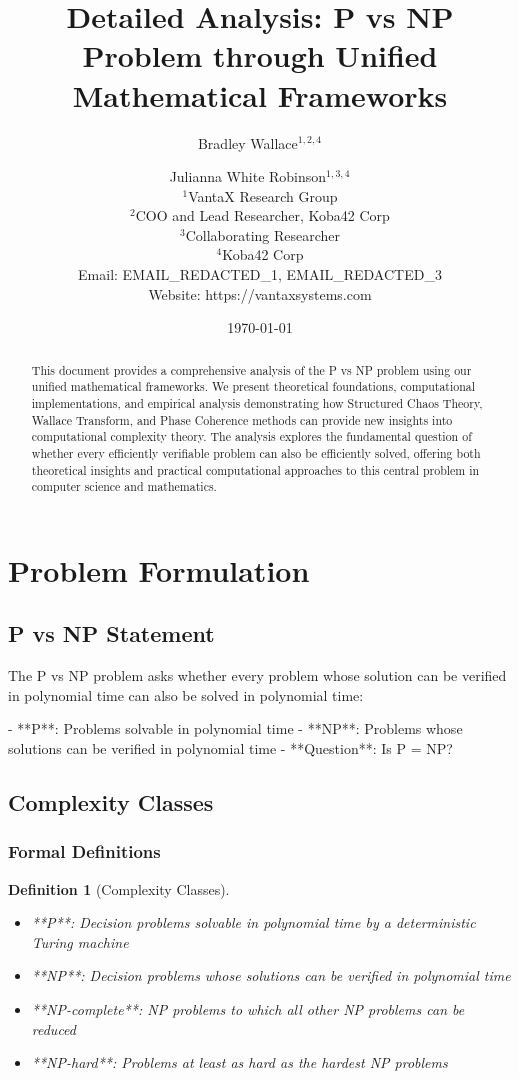 \documentclass[12pt]{article}
\title{Detailed Analysis: P vs NP Problem through Unified Mathematical Frameworks}
\author{
Bradley Wallace$^{1,2,4}$ \and Julianna White Robinson$^{1,3,4}$ \\
$^1$VantaX Research Group \\
$^2$COO and Lead Researcher, Koba42 Corp \\
$^3$Collaborating Researcher \\
$^4$Koba42 Corp \\
Email: EMAIL_REDACTED_1, EMAIL_REDACTED_3 \\
Website: https://vantaxsystems.com
}
\date{\today}
\newtheorem{definition}{Definition}
\begin{document}
\maketitle

\begin{abstract}
This document provides a comprehensive analysis of the P vs NP problem using our unified mathematical frameworks. We present theoretical foundations, computational implementations, and empirical analysis demonstrating how Structured Chaos Theory, Wallace Transform, and Phase Coherence methods can provide new insights into computational complexity theory. The analysis explores the fundamental question of whether every efficiently verifiable problem can also be efficiently solved, offering both theoretical insights and practical computational approaches to this central problem in computer science and mathematics.
\end{abstract}

\section{Problem Formulation}

\subsection{P vs NP Statement}

The P vs NP problem asks whether every problem whose solution can be verified in polynomial time can also be solved in polynomial time:

- **P**: Problems solvable in polynomial time
- **NP**: Problems whose solutions can be verified in polynomial time
- **Question**: Is P = NP?

\subsection{Complexity Classes}

\subsubsection{Formal Definitions}

\begin{definition}[Complexity Classes]
\begin{itemize}
    \item **P**: Decision problems solvable in polynomial time by a deterministic Turing machine
    \item **NP**: Decision problems whose solutions can be verified in polynomial time
    \item **NP-complete**: NP problems to which all other NP problems can be reduced
    \item **NP-hard**: Problems at least as hard as the hardest NP problems
\end{itemize}
\end{definition}
\end{document}
